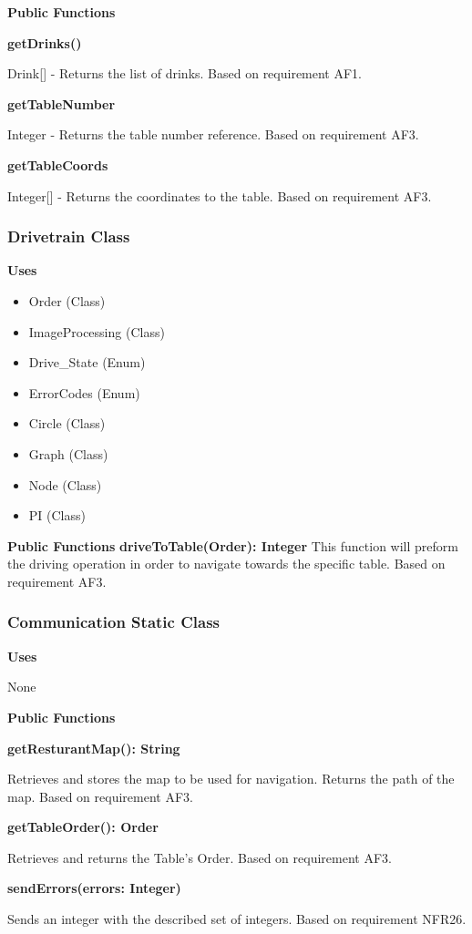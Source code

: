 \documentclass [10pt]{article}
\begin{document}
\textbf{Public Functions}

\textbf{getDrinks()}

Drink[] - Returns the list of drinks. Based on requirement AF1.

\textbf{getTableNumber}

 Integer - Returns the table number reference. Based on requirement AF3.

\textbf{getTableCoords}

 Integer[] - Returns the coordinates to the table. Based on requirement AF3.

\subsubsection{Drivetrain Class}
\textbf{Uses}
\begin{itemize}
	\item Order (Class)
	\item ImageProcessing (Class)
	\item Drive\_State (Enum)
	\item ErrorCodes (Enum)
	\item Circle (Class)
	\item Graph (Class)
	\item Node (Class)
	\item PI (Class)
\end{itemize}

\textbf{Public Functions}
\textbf{driveToTable(Order): Integer}
This function will preform the driving operation in order to navigate towards the specific table. Based on requirement AF3.

\subsubsection{Communication Static Class}
\textbf{Uses}

None 

\textbf{Public Functions}

\textbf{getResturantMap(): String}

Retrieves and stores the map to be used for navigation. Returns the path of the map. Based on requirement AF3.

\textbf{getTableOrder(): Order}

Retrieves and returns the Table's Order. Based on requirement AF3.

\textbf{sendErrors(errors: Integer)}

Sends an integer with the described set of integers. Based on requirement NFR26.
\end{document}

